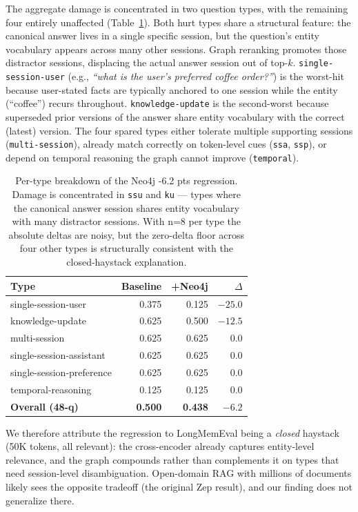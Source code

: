 The aggregate damage is concentrated in two question types, with the
remaining four entirely unaffected (Table~\ref{tab:neo4j-subtype}). Both
hurt types share a structural feature: the canonical answer lives in a
single specific session, but the question's entity vocabulary appears
across many other sessions. Graph reranking promotes those distractor
sessions, displacing the actual answer session out of top-$k$.
\texttt{single-session-user} (e.g., \emph{``what is the user's
preferred coffee order?''}) is the worst-hit because user-stated facts
are typically anchored to one session while the entity (``coffee'')
recurs throughout. \texttt{knowledge-update} is the second-worst because
superseded prior versions of the answer share entity vocabulary with the
correct (latest) version. The four spared types either tolerate
multiple supporting sessions (\texttt{multi-session}), already match
correctly on token-level cues (\texttt{ssa}, \texttt{ssp}), or depend
on temporal reasoning the graph cannot improve (\texttt{temporal}).

\begin{table}[h]
\centering
\small
\begin{tabular}{lrrr}
\toprule
\textbf{Type} & \textbf{Baseline} & \textbf{+Neo4j} & \textbf{\(\Delta\)} \\
\midrule
single-session-user & 0.375 & 0.125 & \textbf{\(-25.0\)} \\
knowledge-update    & 0.625 & 0.500 & \textbf{\(-12.5\)} \\
multi-session       & 0.625 & 0.625 & 0.0 \\
single-session-assistant & 0.625 & 0.625 & 0.0 \\
single-session-preference & 0.625 & 0.625 & 0.0 \\
temporal-reasoning  & 0.125 & 0.125 & 0.0 \\
\midrule
\textbf{Overall (48-q)} & \textbf{0.500} & \textbf{0.438} & \textbf{\(-6.2\)} \\
\bottomrule
\end{tabular}
\caption{Per-type breakdown of the Neo4j -6.2 pts regression. Damage
is concentrated in \texttt{ssu} and \texttt{ku} — types where the
canonical answer session shares entity vocabulary with many distractor
sessions. With n=8 per type the absolute deltas are noisy, but the
zero-delta floor across four other types is structurally consistent
with the closed-haystack explanation.}
\label{tab:neo4j-subtype}
\end{table}

We therefore attribute the regression to LongMemEval being a
\emph{closed} haystack (50K tokens, all relevant): the cross-encoder
already captures entity-level relevance, and the graph compounds rather
than complements it on types that need session-level disambiguation.
Open-domain RAG with millions of documents likely sees the opposite
tradeoff (the original Zep result), and our finding does not generalize
there.

